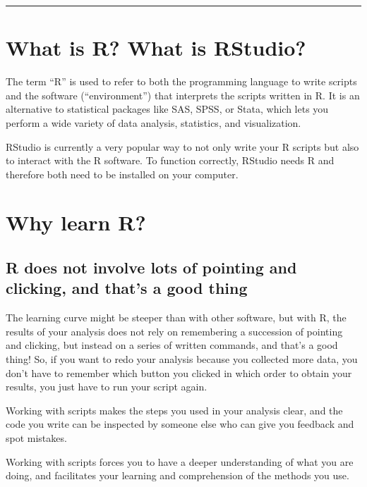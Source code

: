 \documentclass[
]{book}
\begin{document}
\begin{center}\rule{0.5\linewidth}{0.5pt}\end{center}

\hypertarget{what-is-r-what-is-rstudio}{%
\section{What is R? What is RStudio?}\label{what-is-r-what-is-rstudio}}

The term ``R'' is used to refer to both the programming language to write scripts and the software (``environment'') that interprets the scripts written in R. It is an alternative to statistical packages like SAS, SPSS, or Stata, which lets you perform a wide variety of data analysis, statistics, and visualization.

RStudio is currently a very popular way to not only write your R scripts but
also to interact with the R software. To function correctly, RStudio needs R and therefore both need to be installed on your computer.

\hypertarget{why-learn-r}{%
\section{Why learn R?}\label{why-learn-r}}

\hypertarget{r-does-not-involve-lots-of-pointing-and-clicking-and-thats-a-good-thing}{%
\subsection{R does not involve lots of pointing and clicking, and that's a good thing}\label{r-does-not-involve-lots-of-pointing-and-clicking-and-thats-a-good-thing}}

The learning curve might be steeper than with other software, but with R, the
results of your analysis does not rely on remembering a succession of pointing
and clicking, but instead on a series of written commands, and that's a good
thing! So, if you want to redo your analysis because you collected more data,
you don't have to remember which button you clicked in which order to obtain
your results, you just have to run your script again.

Working with scripts makes the steps you used in your analysis clear, and the
code you write can be inspected by someone else who can give you feedback and
spot mistakes.

Working with scripts forces you to have a deeper understanding of what you are
doing, and facilitates your learning and comprehension of the methods you use.
\end{document}
